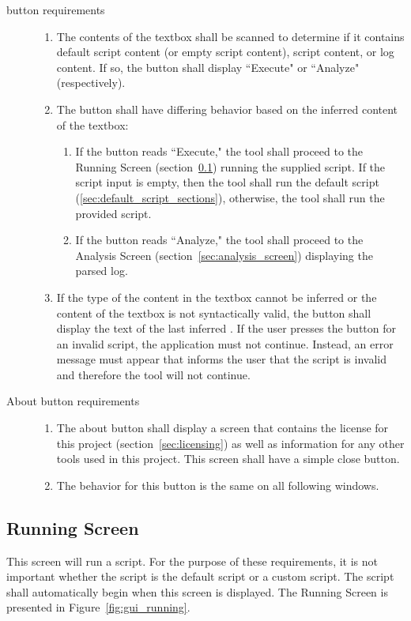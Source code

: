 \begin{description}
\item[ button requirements] \hfill
\begin{enumerate}
\item The contents of the textbox shall be scanned to determine if it contains
default script content (or empty script content), script content, or log
content.  If so, the button shall display ``Execute" or ``Analyze"
(respectively).
\item The button shall have differing behavior based on the inferred content of
the textbox:
\begin{enumerate}
\item If the button reads ``Execute," the tool shall proceed to the Running
Screen (section~\ref{sec:running_screen}) running the supplied script.  If the
script input is empty, then the tool shall run the default script
(\ref{sec:default_script_sections}), otherwise, the tool shall run the provided
script.
\item If the button reads ``Analyze," the tool shall proceed to the Analysis
Screen (section~\ref{sec:analysis_screen}) displaying the parsed log.
\end{enumerate}
\item If the type of the content in the textbox cannot be inferred or the
content of the textbox is not syntactically valid, the button shall display
the text of the last inferred .  If the user presses the
 button for an invalid script, the application must not continue. 
Instead, an error message must appear that informs the user that the script is
invalid and therefore the tool will not continue.
\end{enumerate}

\item[About button requirements] \hfill
\begin{enumerate}
\item The about button shall display a screen that contains the license for this
project (section~\ref{sec:licensing}) as well as information for any other
tools used in this project.  This screen shall have a simple close button.
\item The behavior for this button is the same on all following windows. 
\end{enumerate}
\end{description}

\subsection{Running Screen} \label{sec:running_screen}
This screen will run a script.  For the purpose of these requirements, it is not
important whether the script is the default script or a custom script.  The
script shall automatically begin when this screen is displayed.  The Running 
Screen is presented in Figure~\ref{fig:gui_running}.

